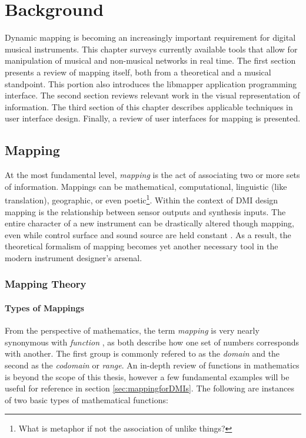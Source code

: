 \chapter{Background}

Dynamic mapping is becoming an increasingly important requirement for digital musical instruments. This chapter surveys currently available tools that allow for manipulation of musical and non-musical networks in real time. The first section presents a review of mapping itself, both from a theoretical and a musical standpoint. This portion also introduces the libmapper application programming interface. The second section reviews relevant work in the visual representation of information. The third section of this chapter describes applicable techniques in user interface design. Finally, a review of user interfaces for mapping is presented.

\section{Mapping}

	At the most fundamental level, \emph{mapping} is the act of associating two or more sets of information. Mappings can be mathematical, computational, linguistic (like translation), geographic, or even poetic\footnote{What is metaphor if not the association of unlike things?}. Within the context of DMI design mapping is the relationship between sensor outputs and synthesis inputs. The entire character of a new instrument can be drastically altered though mapping, even while control surface and sound source are held constant . As a result, the theoretical formalism of mapping becomes yet another necessary tool in the modern instrument designer's arsenal.

	\subsection{Mapping Theory}
	\subsubsection{Types of Mappings}

	From the perspective of mathematics, the term \emph{mapping} is very nearly synonymous with \emph{function} \cite{native_set_theory}, as both describe how one set of numbers corresponds with another. The first group is commonly refered to as the \emph{domain} and the second as the \emph{codomain} or \emph{range}. An in-depth review of functions in mathematics is beyond the scope of this thesis, however a few fundamental examples will be useful for reference in section \ref{sec:mappingforDMIs}. The following are instances of two basic types of mathematical functions:

